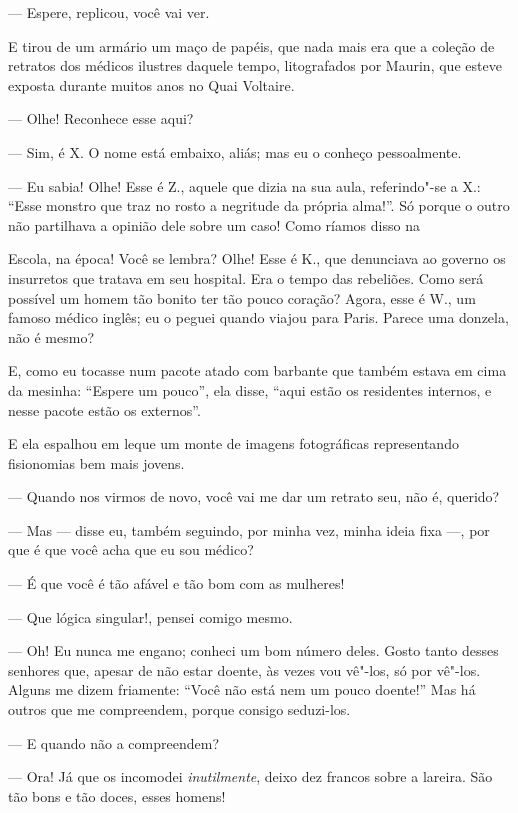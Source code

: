 --- Espere, replicou, você vai ver.

E tirou de um armário um maço de papéis, que nada mais era que a
coleção de retratos dos médicos ilustres daquele tempo, litografados
por Maurin, que esteve exposta durante muitos anos no Quai
Voltaire.

--- Olhe! Reconhece esse aqui?

--- Sim, é X. O nome está embaixo, aliás; mas eu o conheço
pessoalmente.

--- Eu sabia! Olhe! Esse é Z., aquele que dizia na sua aula,
referindo"-se a X.: “Esse monstro que traz no rosto a
negritude da própria alma!''. Só porque o outro não
partilhava a opinião dele sobre um caso! Como ríamos disso na

\quebra

\noindent{}Escola, na época! Você se lembra? Olhe! Esse é K., que
denunciava ao governo os insurretos que tratava em seu hospital. Era o
tempo das rebeliões. Como será possível um homem tão bonito ter tão
pouco coração? Agora, esse é W., um famoso médico inglês; eu o
peguei quando viajou para Paris. Parece uma donzela, não é
mesmo?

E, como eu tocasse num pacote atado com barbante que também estava em cima da
mesinha: “Espere um pouco'', ela disse, “aqui estão os residentes internos, e nesse pacote estão os externos''.

E ela espalhou em leque um monte de imagens fotográficas 
representando fisionomias bem mais jovens.

--- Quando nos virmos de novo, você vai me dar um retrato seu,
não é, querido?

--- Mas --- disse eu, também seguindo, por minha vez, minha ideia fixa ---,
por que é que você acha que eu sou médico?

--- É que você é tão afável e tão bom com as mulheres!

--- Que lógica singular!, pensei comigo mesmo.

--- Oh! Eu nunca me engano; conheci um bom número deles. Gosto tanto
desses senhores que, apesar de não estar doente, às vezes vou vê"-los,
só por vê"-los. Alguns me dizem friamente: “Você não
está nem um pouco doente!'' Mas há outros que me
compreendem, porque consigo seduzi-los.

--- E quando não a compreendem?

--- Ora! Já que os incomodei \textit{inutilmente}, deixo dez francos sobre a
lareira. São tão bons e tão doces, esses homens!

